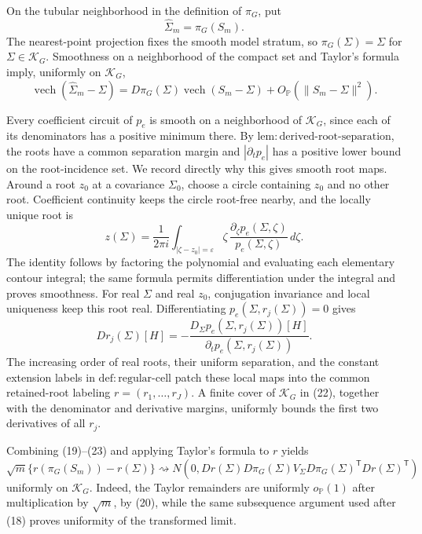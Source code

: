 On the tubular neighborhood in the definition of \(\pi_G\), put
\[
 \widehat\Sigma_m=\pi_G(S_m).
\]
The nearest-point projection fixes the smooth model stratum, so \(\pi_G(\Sigma)=\Sigma\) for \(\Sigma\in\mathcal K_G\).  Smoothness on a neighborhood of the compact set and Taylor's formula imply, uniformly on \(\mathcal K_G\),
\[
 \operatorname{vech}(\widehat\Sigma_m-\Sigma)
 =D\pi_G(\Sigma)\operatorname{vech}(S_m-\Sigma)
 +O_{\mathbb P}(\|S_m-\Sigma\|^2).
\tag{21}
\]

Every coefficient circuit of \(p_e\) is smooth on a neighborhood of \(\mathcal K_G\), since each of its denominators has a positive minimum there.  By \(\mathrm{lem:derived\mbox{-}root\mbox{-}separation}\), the roots have a common separation margin and \(|\partial_t p_e|\) has a positive lower bound on the root-incidence set.  We record directly why this gives smooth root maps.  Around a root \(z_0\) at a covariance \(\Sigma_0\), choose a circle containing \(z_0\) and no other root.  Coefficient continuity keeps the circle root-free nearby, and the locally unique root is
\[
 z(\Sigma)=\frac{1}{2\pi i}\int_{|\zeta-z_0|=\varepsilon}
 \zeta\,\frac{\partial_\zeta p_e(\Sigma,\zeta)}{p_e(\Sigma,\zeta)}\,d\zeta.
\tag{22}
\]
The identity follows by factoring the polynomial and evaluating each elementary contour integral; the same formula permits differentiation under the integral and proves smoothness.  For real \(\Sigma\) and real \(z_0\), conjugation invariance and local uniqueness keep this root real.  Differentiating \(p_e(\Sigma,r_j(\Sigma))=0\) gives
\[
 Dr_j(\Sigma)[H]
 =-\frac{D_\Sigma p_e(\Sigma,r_j(\Sigma))[H]}
          {\partial_t p_e(\Sigma,r_j(\Sigma))}.
\tag{23}
\]
The increasing order of real roots, their uniform separation, and the constant extension labels in \(\mathrm{def:regular\mbox{-}cell}\) patch these local maps into the common retained-root labeling \(r=(r_1,\ldots,r_J)\).  A finite cover of \(\mathcal K_G\) in (22), together with the denominator and derivative margins, uniformly bounds the first two derivatives of all \(r_j\).

Combining (19)--(23) and applying Taylor's formula to \(r\) yields
\[
 \sqrt m\{r(\pi_G(S_m))-r(\Sigma)\}
 \rightsquigarrow N\!\left(0,
 Dr(\Sigma)D\pi_G(\Sigma)V_\Sigma
 D\pi_G(\Sigma)^{\mathsf T}Dr(\Sigma)^{\mathsf T}
 \right)
\tag{24}
\]
uniformly on \(\mathcal K_G\).  Indeed, the Taylor remainders are uniformly \(o_{\mathbb P}(1)\) after multiplication by \(\sqrt m\), by (20), while the same subsequence argument used after (18) proves uniformity of the transformed limit.

